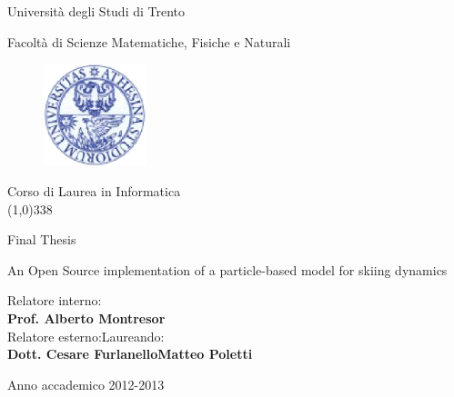 \documentclass[12pt,a4paper,twoside]{book}
\begin{document}
\begin{titlepage}
  \begin{center}
    \begin{Large}Universit\`a degli Studi di Trento\\\end{Large}
     Facolt\`a di Scienze Matematiche, Fisiche e Naturali\\
     \vspace{10pt}
     \begin{figure}[htbp]
       \begin{center}
         \includegraphics[width=3cm]{images/sigillo_unitn.eps}
       \end{center}
     \end{figure}
Corso di Laurea in Informatica\\

\vspace{10pt}
\line(1,0){338}
\vspace{10pt}

Final Thesis\\
\end{center}
\vspace{3cm}
\begin{center}
\begin{Large}An Open Source implementation of a particle-based model for skiing dynamics\\\end{Large}
\vspace{3cm}
\end{center}
Relatore interno: \\ \textbf{Prof. Alberto Montresor} \\
Relatore esterno:\hspace{6.8cm}Laureando:   \\
\textbf{Dott. Cesare Furlanello}\hspace{4.9cm}\textbf{Matteo Poletti}
\vspace{1cm}
\begin{center}
Anno accademico 2012-2013
\end{center}
\end{titlepage}
\tableofcontents
\end{document}
